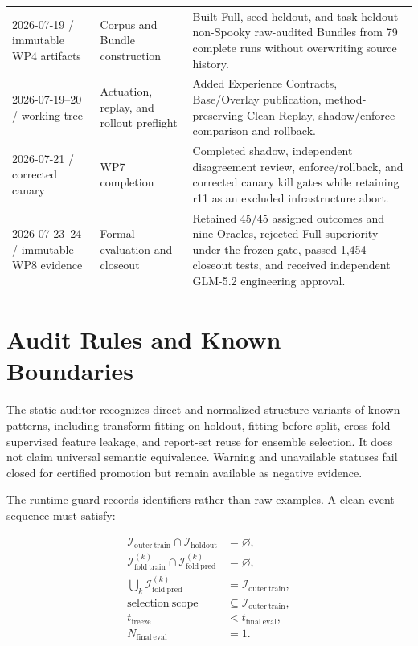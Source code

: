 \documentclass{article}
\begin{document}
\begin{table}[h]
\begin{tabular}{p{}p{}p{}}
2026-07-19 / immutable WP4 artifacts & Corpus and Bundle construction & Built Full, seed-heldout, and task-heldout non-Spooky raw-audited Bundles from 79 complete runs without overwriting source history. \\
2026-07-19--20 / working tree & Actuation, replay, and rollout preflight & Added Experience Contracts, Base/Overlay publication, method-preserving Clean Replay, shadow/enforce comparison and rollback. \\
2026-07-21 / corrected canary & WP7 completion & Completed shadow, independent disagreement review, enforce/rollback, and corrected canary kill gates while retaining r11 as an excluded infrastructure abort. \\
2026-07-23--24 / immutable WP8 evidence & Formal evaluation and closeout & Retained 45/45 assigned outcomes and nine Oracles, rejected Full superiority under the frozen gate, passed 1,454 closeout tests, and received independent GLM-5.2 engineering approval. \\
\bottomrule
\end{tabular}
\end{table}
\FloatBarrier

\section{Audit Rules and Known Boundaries}

The static auditor recognizes direct and normalized-structure variants of known
patterns, including transform fitting on holdout, fitting before split,
cross-fold supervised feature leakage, and report-set reuse for ensemble
selection.  It does not claim universal semantic equivalence.  Warning and
unavailable statuses fail closed for certified promotion but remain available as
negative evidence.

The runtime guard records identifiers rather than raw examples.  A clean event
sequence must satisfy:

\begin{align*}
  \mathcal{I}_{\mathrm{outer\ train}} \cap
  \mathcal{I}_{\mathrm{holdout}} &= \varnothing,\\
  \mathcal{I}_{\mathrm{fold\ train}}^{(k)} \cap
  \mathcal{I}_{\mathrm{fold\ pred}}^{(k)} &= \varnothing,\\
  \bigcup_k \mathcal{I}_{\mathrm{fold\ pred}}^{(k)}
  &= \mathcal{I}_{\mathrm{outer\ train}},\\
  \mathrm{selection\ scope} &\subseteq \mathcal{I}_{\mathrm{outer\ train}},\\
  t_{\mathrm{freeze}} &< t_{\mathrm{final\ eval}},\\
  N_{\mathrm{final\ eval}} &= 1.
\end{align*}
\end{document}
